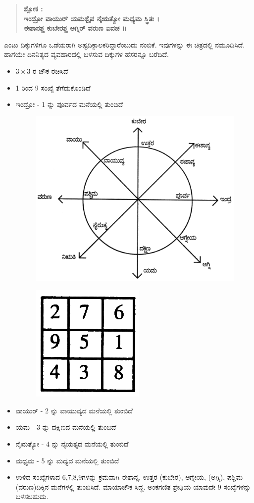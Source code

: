 \begin{quote}
\textbf{ಶ್ಲೋಕ :}\\
\textbf{ಇಂದ್ರೋ ವಾಯುರ್ ಯಮಶ್ಬೈವ ನೈಋತ್ಯೋ ಮಧ್ಯಮ ಸ್ಥಿತಃ ।}\\
\textbf{ಈಶಾನಶ್ಚ ಕುಬೇರಶ್ಚ ಅಗ್ನಿರ್ ವರುಣ ಏವಚ ॥}
\end{quote}
ಎಂಟು ದಿಕ್ಕುಗಳಿಗೂ ಒಡೆಯರಾಗಿ ಅಷ್ಟದಿಕ್ಪಾಲಕರಿದ್ದಾರೆಂಬುದು ನಂಬಿಕೆ. ಇವುಗಳನ್ನು ಈ ಚಿತ್ರದಲ್ಲಿ ನಮೂದಿಸಿದೆ. ಹಾಗೆಯೇ ದಿನನಿತ್ಯದ ವ್ಯವಹಾರದಲ್ಲಿ ಬಳಸುವ ದಿಕ್ಕುಗಳ ಹೆಸರನ್ನೂ ಬರೆದಿದೆ.
\begin{itemize}
	\item $3 \times 3$ ರ ಚೌಕ ರಚಿಸಿದೆ
	\item 1 ರಿಂದ 9 ಸಂಖ್ಯೆ ತೆಗೆದುಕೊಂಡಿದೆ
	\item ಇಂದ್ರೋ - 1 ನ್ನು ಪೂರ್ವದ ಮನೆಯಲ್ಲಿ ತುಂಬಿದೆ
	\begin{figure}[h]
	\includegraphics{src/figures/chap3/fig3.38.jpg}
	\end{figure}
	\begin{figure}[h]
	\includegraphics{src/figures/chap3/fig3.39.jpg}
	\end{figure}
	\item ವಾಯುರ್ - 2 ನ್ನು ವಾಯುವ್ಯದ ಮನೆಯಲ್ಲಿ ತುಂಬಿದೆ
	\item ಯಮ - 3 ನ್ನು ದಕ್ಷಿಣದ ಮನೆಯಲ್ಲಿ ತುಂಬಿದೆ
	\item ನೈಋತ್ಯೋ - 4 ನ್ನು ನೈಋತ್ಯದ ಮನೆಯಲ್ಲಿ ತುಂಬಿದೆ
	\item ಮಧ್ಯಮ - 5 ನ್ನು ಮಧ್ಯದ ಮನೆಯಲ್ಲಿ ತುಂಬಿದೆ
	\item ಉಳಿದ ಸಂಖ್ಯೆಗಳಾದ 6,7,8,9ಗಳನ್ನು ಕ್ರಮವಾಗಿ ಈಶಾನ್ಯ, ಉತ್ತರ (ಕುಬೇರ), ಆಗ್ನೇಯ, (ಅಗ್ನಿ), ಪಶ್ಚಿಮ (ವರುಣ)ದಿಕ್ಕಿನ ಮನೆಗಳಲ್ಲಿ ತುಂಬಿಸಿದೆ. ಮಾಯಾಚೌಕ ಸಿದ್ಧ. ಅಂಕಗಣಿತ ಶ್ರೇಢಿಯ ಯಾವುದೇ 9 ಸಂಖ್ಯೆಗಳನ್ನು ಬಳಸಬಹುದು.
\end{itemize}

